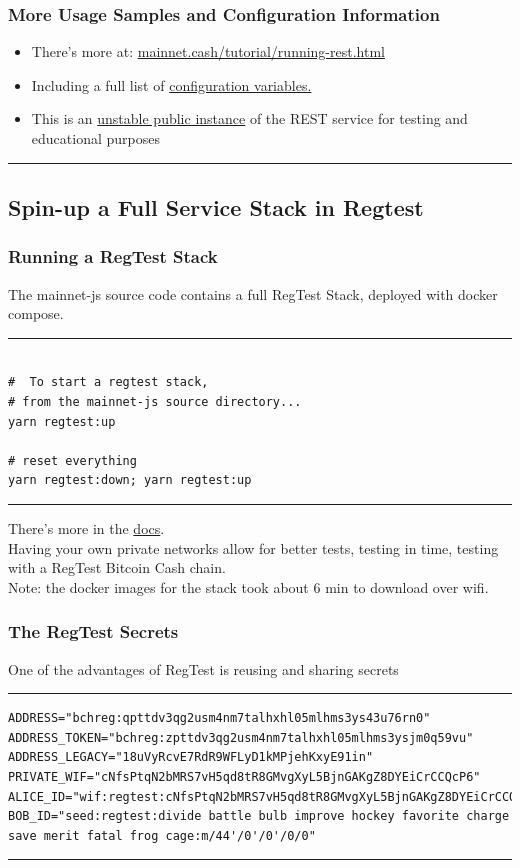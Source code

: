 \documentclass{beamer}
\begin{document}
\begin{frame}[fragile]
    \frametitle{More Usage Samples and Configuration Information}
  \begin{itemize}
    \item
      There's more at: \href{https://mainnet.cash/tutorial/running-rest.html}{mainnet.cash/tutorial/running-rest.html}
    \item
      Including a full list of \href{https://mainnet.cash/tutorial/running-rest.html#configuration}{configuration variables.}
    \item
      This is an \href{https://rest-unstable.mainnet.cash/api-docs/}{unstable public instance} of the REST service for testing and educational purposes
    \end{itemize}
        
\rule{\textwidth}{0.9pt}
\end{frame}

\subsection[RegTest Stack]{Spin-up a Full Service Stack in Regtest}

\begin{frame}[fragile]
    \frametitle{Running a RegTest Stack}
      The mainnet-js source code contains a full RegTest Stack, deployed with docker compose.
    \rule{\textwidth}{0.6pt}
    \tiny
    \begin{verbatim}

#  To start a regtest stack,
# from the mainnet-js source directory...
yarn regtest:up

# reset everything
yarn regtest:down; yarn regtest:up
    \end{verbatim}
\rule{\textwidth}{0.6pt}
There's more in the \href{http://mainnet.cash/tutorial/#regtest-wallets}{docs}.\\


Having your own private networks allow for better tests, testing in time, testing with a RegTest Bitcoin Cash chain. \\ 
Note: the docker images for the stack took about 6 min to download over wifi.
\end{frame}

\begin{frame}[fragile]
    \frametitle{The RegTest Secrets}
    One of the advantages of RegTest is reusing and sharing secrets  
    \rule{\textwidth}{0.4pt}
    \tiny
    \begin{verbatim}
ADDRESS="bchreg:qpttdv3qg2usm4nm7talhxhl05mlhms3ys43u76rn0"
ADDRESS_TOKEN="bchreg:zpttdv3qg2usm4nm7talhxhl05mlhms3ysjm0q59vu"
ADDRESS_LEGACY="18uVyRcvE7RdR9WFLyD1kMPjehKxyE91in"
PRIVATE_WIF="cNfsPtqN2bMRS7vH5qd8tR8GMvgXyL5BjnGAKgZ8DYEiCrCCQcP6"
ALICE_ID="wif:regtest:cNfsPtqN2bMRS7vH5qd8tR8GMvgXyL5BjnGAKgZ8DYEiCrCCQcP6"
BOB_ID="seed:regtest:divide battle bulb improve hockey favorite charge save merit fatal frog cage:m/44'/0'/0'/0/0"

    \end{verbatim}
\rule{\textwidth}{0.4pt}
\end{frame}
\end{document}
